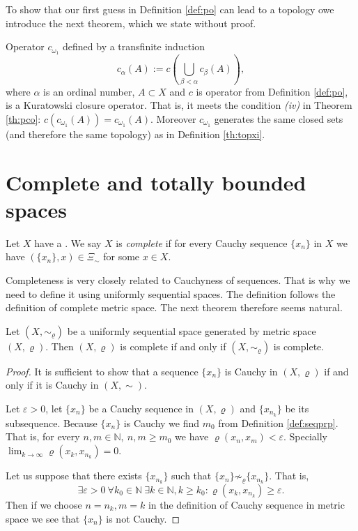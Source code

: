To show that our first guess in Definition \ref{def:po} can lead to a topology owe introduce the next theorem, which we state without proof.

\begin{theorem} \label{th:topxi}
Operator $c_{\omega_1}$ defined by a transfinite induction
\[
	c_\alpha(A):=c\left(\bigcup_{\beta<\alpha} c_\beta(A)\right),
\]
where $\alpha$ is an ordinal number, $A\subset X$ and $c$ is operator from Definition \ref{def:po}, is a Kuratowski closure operator. That is, it meets the condition \emph{(iv)} in Theorem \ref{th:pco}:  $c(c_{\omega_1}(A))=c_{\omega_1}(A)$. Moreover $c_{\omega_1}$ generates the same closed sets (and therefore the same topology) as in Definition \ref{th:topxi}.
\end{theorem}

\section{Complete and totally bounded spaces}

\begin{define}\label{def:scompl}
	Let $X$ have a \uss. We say $X$ is \emph{complete} if for every Cauchy sequence $\{x_n\}$ in $X$ we have $(\{x_n\}, x)\in\Xi_\sim$ for some $x\in X$.
\end{define}

Completeness is very closely related to Cauchyness of sequences. That is why we need to define it using uniformly sequential spaces. The definition follows the definition of complete metric space. The next theorem therefore seems natural.

\begin{theorem} \label{th:scomplcompl}
	Let $(X,\sim_\varrho)$ be a uniformly sequential space generated by metric space $(X,\varrho)$. Then $(X,\varrho)$ is complete if and only if $(X,\sim_\varrho)$ is complete.
\end{theorem}
\begin{proof}
It is sufficient to show that a sequence $\{x_n\}$ is Cauchy in $(X,\varrho)$ if and only if it is Cauchy in $(X,\sim)$.

Let $\varepsilon>0$, let $\{x_n\}$ be a Cauchy sequence in $(X,\varrho)$ and $\{x_{n_k}\}$ be its subsequence. Because $\{x_n\}$ is Cauchy we find $m_0$ from Definition \ref{def:seqprp}. That is, for every $n,m\in \mathbb{N},\ n,m\ge m_0$ we have $\varrho(x_n,x_m)<\varepsilon$. Specially $\lim_{k\to\infty}\varrho(x_k, x_{n_k})=0$.

Let us suppose that there exists $\{x_{n_k}\}$ such that $\{x_n\}\not\sim_\varrho\{x_{n_k}\}$. That is,
\[
	\exists\varepsilon>0\ \forall k_0\in \mathbb{N}\ \exists k\in \mathbb{N}, k\ge k_0: \varrho(x_k, x_{n_k})\ge \varepsilon.
\]
Then if we choose $n=n_k, m=k$ in the definition of Cauchy sequence in metric space we see that $\{x_n\}$ is not Cauchy.
\end{proof}


